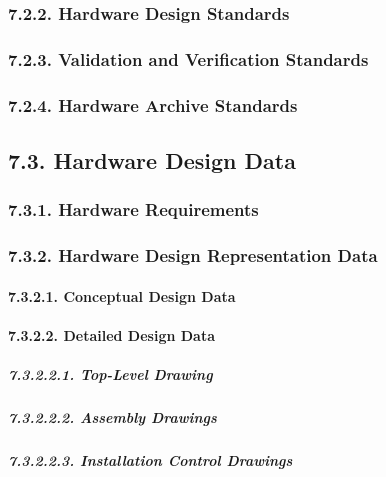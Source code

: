 \documentclass[]{article}
\let\oldparagraph\paragraph
\renewcommand{\paragraph}[1]{\oldparagraph{#1}\mbox{}}
\let\oldsubparagraph\subparagraph
\renewcommand{\subparagraph}[1]{\oldsubparagraph{#1}\mbox{}}
\begin{document}
\subsubsection{7.2.2. Hardware Design
Standards}\label{hardware-design-standards}

\subsubsection{7.2.3. Validation and Verification
Standards}\label{validation-and-verification-standards}

\subsubsection{7.2.4. Hardware Archive
Standards}\label{hardware-archive-standards}

\subsection{7.3. Hardware Design Data}\label{hardware-design-data}

\subsubsection{7.3.1. Hardware
Requirements}\label{hardware-requirements}

\subsubsection{7.3.2. Hardware Design Representation
Data}\label{hardware-design-representation-data}

\paragraph{7.3.2.1. Conceptual Design
Data}\label{conceptual-design-data}

\paragraph{7.3.2.2. Detailed Design Data}\label{detailed-design-data}

\subparagraph{7.3.2.2.1. Top-Level Drawing}\label{top-level-drawing}

\subparagraph{7.3.2.2.2. Assembly Drawings}\label{assembly-drawings}

\subparagraph{7.3.2.2.3. Installation Control
Drawings}\label{installation-control-drawings}
\end{document}
